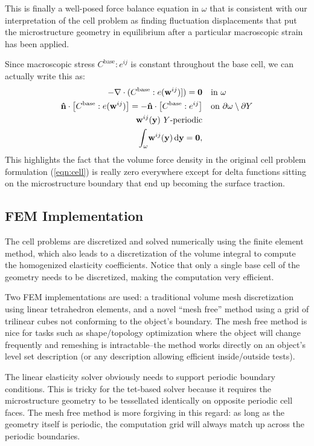 \documentclass[10pt]{article}
\begin{document}
This is finally a well-posed force balance equation in $\omega$ that is
consistent with our interpretation of the cell problem as finding fluctuation
displacements that put the microstructure geometry in equilibrium after a
particular macroscopic strain has been applied.

Since macroscopic stress $C^\text{base} : e^{ij}$ is constant throughout the
base cell, we can actually write this as:
\begin{align*}
     -\nabla \cdot (C^\text{base} : e({\bf w}^{ij})]) = {\bf 0} & \quad \text{in } \omega \\
{\bf \hat n} \cdot \left[ C^\text{base} : e({\bf w}^{ij}) \right]  =  -{\bf \hat{n}} \cdot \left[ C^\text{base} : e^{ij} \right]& \quad \text{on } \partial \omega \setminus \partial Y \\
    {\bf w}^{ij}({\bf y})\ Y \text{-periodic} & \\
    \int_\omega \! {\bf w}^{ij}({\bf y})  \, \mathrm{d} {\bf y} =  {\bf 0}, 
\end{align*}
This highlights the fact that the volume force density in the original cell
problem formulation (\ref{eqn:cell}) is really zero everywhere except for delta
functions sitting on the microstructure boundary that end up becoming the
surface traction.

\subsection{FEM Implementation}
The cell problems are discretized and solved numerically using the finite
element method, which also leads to a discretization of the volume integral
to compute the homogenized elasticity coefficients. Notice that only a
single base cell of the geometry needs to be discretized, making the
computation very efficient.

Two FEM implementations are used: a traditional volume mesh discretization using
linear tetrahedron elements, and a novel ``mesh free'' method using a grid of
trilinear cubes not conforming to the object's boundary. The mesh free method is
nice for tasks such as shape/topology optimization where the object will change
frequently and remeshing is intractable--the method works directly on an
object's level set description (or any description allowing efficient
inside/outside tests).

The linear elasticity solver obviously needs to support periodic boundary
conditions. This is tricky for the tet-based solver because it requires the
microstructure geometry to be tessellated identically on opposite periodic cell
faces. The mesh free method is more forgiving in this regard: as long as the
geometry itself is periodic, the computation grid will always match up across
the periodic boundaries.
\end{document}
